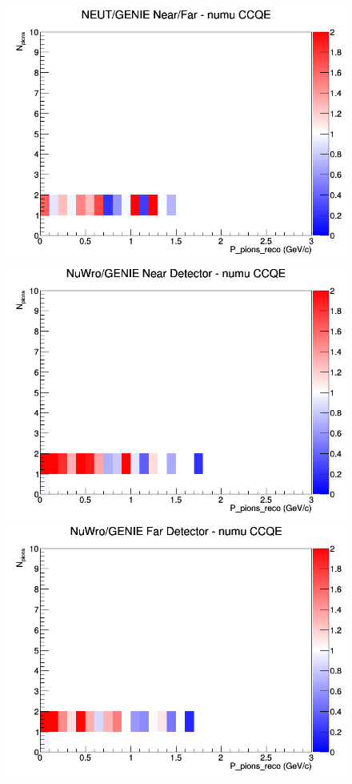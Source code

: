 \documentclass[12pt]{article}
\begin{document}
\begin{figure}[h]
\endminipage
{}
\includegraphics[width=\linewidth]{eff_N_P/FGT/pions/ratios/CCQE_NEUT_GENIE_numu_NF_N_P.png}
\endminipage
\newline
{}
\includegraphics[width=\linewidth]{eff_N_P/FGT/pions/ratios/CCQE_NuWro_GENIE_numu_near_N_P.png}
\endminipage
{}
\includegraphics[width=\linewidth]{eff_N_P/FGT/pions/ratios/CCQE_NuWro_GENIE_numu_far_N_P.png}

\end{figure}
\end{document}
